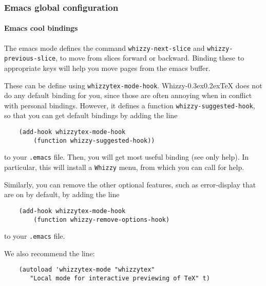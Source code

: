 \documentclass{article}
\makeatletter
\let \lst \verb
\def \whizzy {{Whizzy\kern -0.3ex\raise 0.2ex\hbox{\let \@\relax\TeX}}}
\makeatother
\begin{document}


\subsubsection {Emacs global configuration}

\paragraph {Emacs cool bindings}

The emacs mode defines the command \lst"whizzy-next-slice" and
\lst"whizzy-previous-slice", to move from slices forward or backward.
Binding these to appropriate keys will help you move pages from the emacs
buffer. 

These can be define using \lst"whizzytex-mode-hook". 
{\whizzy} does not do any default binding for you, since those are often
annoying when in conflict with personal bindings. 
However, it defines a function \lst"whizzy-suggested-hook", so that you can
get default bindings by adding the line
\begin{verbatim}
    (add-hook whizzytex-mode-hook 
        (function whizzy-suggested-hook))
\end{verbatim}
to your \lst".emacs" file. 
Then, you will get most useful binding (see only help). 
In particular, this will install a \lst"Whizzy" menu, from which you can
call for help.

Similarly, you can remove the other optional features, 
such as error-display that are on by default, by adding the line
\begin{verbatim}
    (add-hook whizzytex-mode-hook 
        (function whizzy-remove-options-hook)
\end{verbatim}
to your \lst".emacs" file.

We also recommend the line:
\begin{verbatim}
    (autoload 'whizzytex-mode "whizzytex" 
       "Local mode for interactive previewing of TeX" t)
\end{verbatim}
\end{document}
